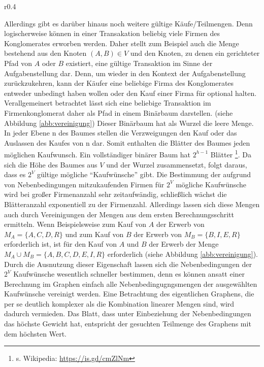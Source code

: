 \begin{wrapfigure}{r}{0.4\textwidth}
  \begin{center}
    \sidesubfloat[]{}
    \vspace{2em}
    \sidesubfloat[]{}
  \end{center}
  \caption{Beispielgraph und binärer Baum}
  \label{abb:vereinigung}
\end{wrapfigure}
Allerdings gibt es darüber hinaus noch weitere gültige Käufe/Teilmengen. Denn logischerweise können in einer Transakation beliebig viele Firmen des Konglomerates erworben werden. Daher stellt zum Beispiel auch die Menge bestehend aus den Knoten \((A, B) \in V\) und den Knoten, zu denen ein gerichteter Pfad von \(A\) oder \(B\) existiert, eine gültige Transaktion im Sinne der Aufgabenstellung dar.
Denn, um wieder in den Kontext der Aufgabenstellung zurückzukehren, kann der Käufer eine beliebige Firma des Konglomerates entweder unbedingt haben wollen oder den Kauf einer Firma für optional halten. 
Verallgemeinert betrachtet lässt sich eine beliebige Transaktion im Firmenkonglomerat daher als Pfad in einem Binärbaum darstellen. (siehe Abbildung \ref{abb:vereinigung})
Dieser Binärbaum hat als Wurzel die leere Menge. In jeder Ebene n des Baumes stellen die Verzweigungen den Kauf oder das Auslassen des Kaufes von n dar. Somit enthalten die Blätter des Baumes jeden möglichen Kaufwunsch. Ein vollständiger binärer Baum hat \(2^{h-1}\) Blätter \footnote{s. Wikipedia: \url{https://is.gd/cmZlNm}}. Da sich die Höhe des Baumes aus \(V\) und der Wurzel zusammensetzt, folgt daraus, dass es \(2^V\) gültige mögliche "`Kaufwünsche"' gibt.
Die Bestimmung der aufgrund von Nebenbedingungen mitzukaufenden Firmen für \(2^V\) mögliche Kaufwünsche wird bei großer Firmenanzahl sehr zeitaufwändig, schließlich wächst die Blätteranzahl exponentiell zu der Firmenzahl. Allerdings lassen sich diese Mengen auch durch Vereinigungen der Mengen aus dem ersten Berechnungsschritt ermitteln.
Wenn Beispielsweise zum Kauf von \(A\) der Erwerb von \(M_A=\{A, C, D, R\}\) und zum Kauf von \(B\) der Erwerb von \(M_B = \{B, I, E, R\}\) erforderlich ist, ist für den Kauf von \(A\) und \(B\) der Erwerb der Menge \(M_A \cup M_B = \{A, B, C, D, E, I, R\}\) erforderlich (siehe Abbildung \ref{abb:vereinigung}).
Durch die Ausnutzung dieser Eigenschaft lassen sich die Nebenbedingungen der \(2^V\) Kaufwünsche wesentlich schneller bestimmen, denn es können ansatt einer Berechnung im Graphen einfach alle Nebenbedingugngsmengen der ausgewählten Kaufwünsche vereinigt werden.
Eine Betrachtung des eigentlichen Graphens, die per se deutlich komplexer als  die Kombination linearer Mengen sind, wird dadurch vermieden.
Das Blatt, dass unter Einbeziehung der Nebenbedingungen das höchste Gewicht hat, entspricht der gesuchten Teilmenge des Graphens mit dem höchsten Wert.

